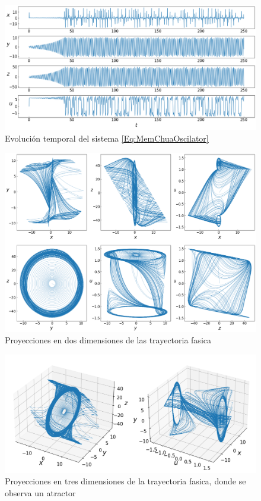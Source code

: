 \documentclass[11pt,letterpaper]{article}
\begin{document}
\begin{multicols*}{2}
\begin{figure}[H]
    \centering
    \includegraphics[scale=0.245]{ModifiedMemristor-basedCanonicalChuaOscillator1D.png}
    \caption{Evolución temporal del sistema \ref{Eq:MemChuaOscilator}}
    \label{Fig:MemCanChuaOscilator1D}
\end{figure}

\begin{figure}[H]
    \centering
    \includegraphics[scale=0.205]{ModifiedMemristor-basedCanonicalChuaOscillator2Dv2.png}
    \caption{Proyecciones en dos dimensiones de las trayectoria fasica}
    \label{Fig:MemCanChuaOscilator2D}
\end{figure}

\begin{figure}[H]
    \includegraphics[scale=0.32]{ModifiedMemristor-basedCanonicalChuaOscillator3D.png}
    \caption{Proyecciones en tres dimensiones de la trayectoria fasica, donde se observa un atractor}
    \label{Fig:MemCanChuaOscilator3D}
\end{figure}


\end{multicols*}
\end{document}
